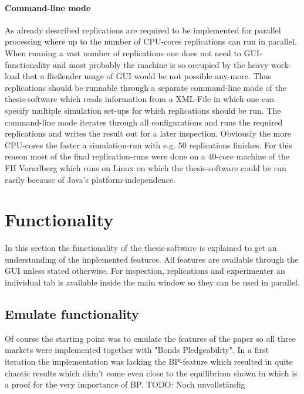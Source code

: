 \documentclass[Bachelorarbeit.tex]{subfiles}
\begin{document}
\paragraph{Command-line mode}
As already described replications are required to be implemented for parallel processing where up to the number of CPU-cores replications can run in parallel. When running a vast number of replications one does not need to GUI-functionality and most probably the machine is so occupied by the heavy work-load that a fließender usage of GUI would be not possible any-more. Thus replications should be runnable through a separate command-line mode of the thesis-software which reads information from a XML-File in which one can specify multiple simulation set-ups for which replications should be run. The command-line mode iterates through all configurations and runs the required replications and writes the result out for a later inspection. Obviously the more CPU-cores the faster a simulation-run with e.g. 50 replications finishes. For this reason most of the final replication-runs were done on a 40-core machine of the FH Vorarlberg which runs on Linux on which the thesis-software could be run easily because of Java's platform-independence.

\section{Functionality}
In this section the functionality of the thesis-software is explained to get an understanding of the implemented features. All features are available through the GUI unless stated otherwise. For inspection, replications and experimenter an individual tab is available inside the main window so they can be used in parallel.

\subsection{Emulate \cite{Breuer2015} functionality}
Of course the starting point was to emulate the features of the \cite{Breuer2015} paper so all three markets were implemented together with "Bonds Pledgeability". In a first iteration the implementation was lacking the BP-feature which resulted in quite chaotic results which didn't come even close to the equilibrium shown in \cite{Breuer2015} which is a proof for the very importance of BP.
TODO: Noch unvollständig
\end{document}
